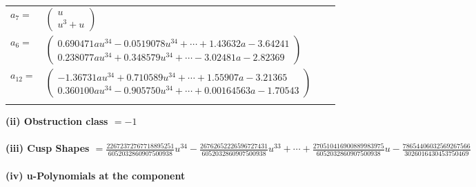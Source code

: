 \documentclass[1p]{elsarticle_modified}
\theoremstyle{definition}
\begin{document}
\begin{tabular}{m{7pt} m{180pt} m{7pt} m{180pt} }
\flushright $a_{7}=$&$\begin{pmatrix}u\\u^3+u\end{pmatrix}$ \\
\flushright $a_{6}=$&$\begin{pmatrix}0.690471 a u^{34}-0.0519078 u^{34}+\cdots+1.43632 a-3.64241\\0.238077 a u^{34}+0.348579 u^{34}+\cdots-3.02481 a-2.82369\end{pmatrix}$ \\
\flushright $a_{12}=$&$\begin{pmatrix}-1.36731 a u^{34}+0.710589 u^{34}+\cdots+1.55907 a-3.21365\\0.360100 a u^{34}-0.905750 u^{34}+\cdots+0.00164563 a-1.70543\end{pmatrix}$\\&\end{tabular}
\flushleft \textbf{(ii) Obstruction class $= -1$}\\~\\
\flushleft \textbf{(iii) Cusp Shapes $= \frac{22672372767718895251}{6052032860907500938} u^{34}-\frac{26762652226596727431}{6052032860907500938} u^{33}+\cdots+\frac{270510416900889983975}{6052032860907500938} u-\frac{78654406032569267566}{3026016430453750469}$}\\~\\
\newpage\renewcommand{\arraystretch}{1}
\flushleft \textbf{(iv) u-Polynomials at the component}\newline \\
\end{document}
